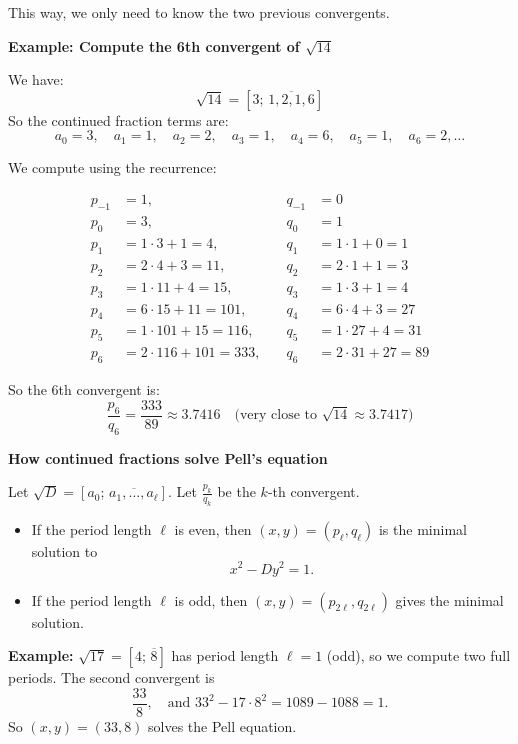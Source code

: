 \documentclass[11pt]{article}
\begin{document}
This way, we only need to know the two previous convergents.

\bigskip
\noindent
\textbf{Example: Compute the 6th convergent of \( \sqrt{14} \)}

We have:
\[
\sqrt{14} = [3;\, \overline{1,2,1,6}]
\]
So the continued fraction terms are:
\[
a_0 = 3,\quad a_1 = 1,\quad a_2 = 2,\quad a_3 = 1,\quad a_4 = 6,\quad a_5 = 1,\quad a_6 = 2,\dots
\]

We compute using the recurrence:

\[
\begin{aligned}
p_{-1} &= 1,\quad &q_{-1} &= 0 \\
p_0 &= 3,\quad &q_0 &= 1 \\
p_1 &= 1 \cdot 3 + 1 = 4,\quad &q_1 &= 1 \cdot 1 + 0 = 1 \\
p_2 &= 2 \cdot 4 + 3 = 11,\quad &q_2 &= 2 \cdot 1 + 1 = 3 \\
p_3 &= 1 \cdot 11 + 4 = 15,\quad &q_3 &= 1 \cdot 3 + 1 = 4 \\
p_4 &= 6 \cdot 15 + 11 = 101,\quad &q_4 &= 6 \cdot 4 + 3 = 27 \\
p_5 &= 1 \cdot 101 + 15 = 116,\quad &q_5 &= 1 \cdot 27 + 4 = 31 \\
p_6 &= 2 \cdot 116 + 101 = 333,\quad &q_6 &= 2 \cdot 31 + 27 = 89
\end{aligned}
\]

So the 6th convergent is:
\[
\frac{p_6}{q_6} = \frac{333}{89} \approx 3.7416 \quad \text{(very close to } \sqrt{14} \approx 3.7417\text{)}
\]

\smallskip
\noindent
\textbf{How continued fractions solve Pell’s equation}

Let \( \sqrt{D} = [a_0;\, \overline{a_1,\dots,a_\ell}] \). Let \( \frac{p_k}{q_k} \) be the $k$-th convergent.

\begin{itemize}
  \item If the period length \( \ell \) is even, then \( (x, y) = (p_\ell, q_\ell) \) is the minimal solution to
  \[
  x^2 - D y^2 = 1.
  \]
  \item If the period length \( \ell \) is odd, then \( (x, y) = (p_{2\ell}, q_{2\ell}) \) gives the minimal solution.
\end{itemize}

\textbf{Example:} \( \sqrt{17} = [4;\, \overline{8}] \) has period length \( \ell = 1 \) (odd), so we compute two full periods. The second convergent is
\[
\frac{33}{8}, \quad \text{and } 33^2 - 17 \cdot 8^2 = 1089 - 1088 = 1.
\]
So \( (x, y) = (33, 8) \) solves the Pell equation.
\end{document}

